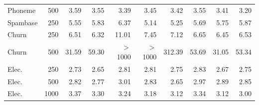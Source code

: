 \begin{tabular}{lrrrrrrrrr}
Phoneme & 500 & 3.59 & 3.55 & 3.39 & 3.45 & 3.42 & 3.55 & 3.41 & 3.20 \\
Spambase & 250 & 5.55 & 5.83 & 6.37 & 5.14 & 5.25 & 5.69 & 5.75 & 5.87 \\
Churn & 250 & 6.51 & 6.32 & 11.01 & 7.45 & 7.12 & 6.65 & 6.45 & 6.53 \\
Churn & 500 & 31.59 & 59.30 & $>$1000 & $>$1000 & 312.39 & 53.69 & 31.05 & 53.34 \\
Elec. & 250 & 2.73 & 2.65 & 2.81 & 2.81 & 2.75 & 2.83 & 2.67 & 2.75 \\
Elec. & 500 & 2.82 & 2.77 & 3.01 & 2.83 & 2.65 & 2.97 & 2.89 & 2.85 \\
Elec. & 1000 & 3.37 & 3.30 & 3.24 & 3.18 & 3.12 & 3.34 & 3.12 & 3.00 \\
\bottomrule
\end{tabular}
